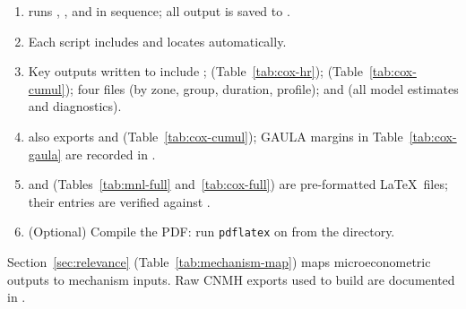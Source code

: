 \documentclass[12pt]{article}
\numberwithin{equation}{section}
\numberwithin{table}{section}
\begin{document}
\begin{sloppypar}
\begin{enumerate}
\item {} runs ,
  , and 
  in sequence; all output is saved to .
\item Each script includes  and locates
   automatically.
\item Key outputs written to  include
  ; 
  (Table~\ref{tab:cox-hr}); 
  (Table~\ref{tab:cox-cumul}); four  files
  (by zone, group, duration, profile); and 
  (all model estimates and diagnostics).
\item {} also exports
   and 
  (Table~\ref{tab:cox-cumul}); GAULA margins in Table~\ref{tab:cox-gaula}
  are recorded in .
\item {} and 
  (Tables~\ref{tab:mnl-full} and~\ref{tab:cox-full}) are pre-formatted
  \LaTeX\ files; their entries are verified against .
\item (Optional) Compile the PDF: run \texttt{pdflatex}
  on  from the  directory.
\end{enumerate}
\end{sloppypar}

\begin{sloppypar}
Section~\ref{sec:relevance} (Table~\ref{tab:mechanism-map}) maps
microeconometric outputs to mechanism inputs. Raw CNMH exports used to build
 are documented in .
\end{sloppypar}



\end{document}
